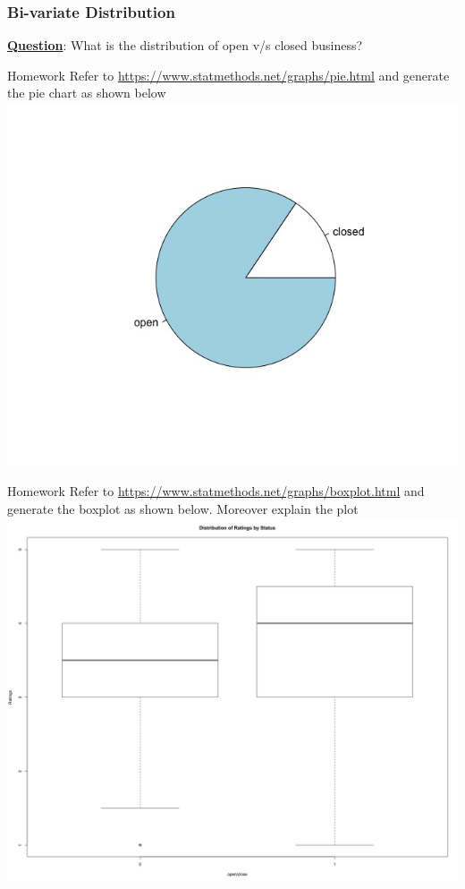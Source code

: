 \documentclass[12pt]{book}\usepackage{knitr}
\begin{document}
\newpage
\subsubsection{Bi-variate Distribution}
\noindent \textbf{\underline{Question}}: What is the distribution of open v/s closed business? 
\begin{knitrout}
\color{fgcolor}\begin{kframe}
\begin{alltt}
\hlopt{$}
\end{alltt}
\end{kframe}
\end{knitrout}

\begin{DIY}{Homework}
\noindent Refer to \textcolor{cyan}{\url{https://www.statmethods.net/graphs/pie.html}} and generate the pie chart as shown below
\includegraphics[width=9 cm]{./viz/ext/pieChartBusinessStatus.jpeg}
\end{DIY}


\begin{DIY}{Homework}
\noindent Refer to \textcolor{cyan}{\url{https://www.statmethods.net/graphs/boxplot.html}} and generate the boxplot as shown below. Moreover explain the plot
\includegraphics[width=12 cm]{./viz/ext/BoxPlot_Ratings_OpenStatus.jpeg}
\end{DIY}
\end{document}
